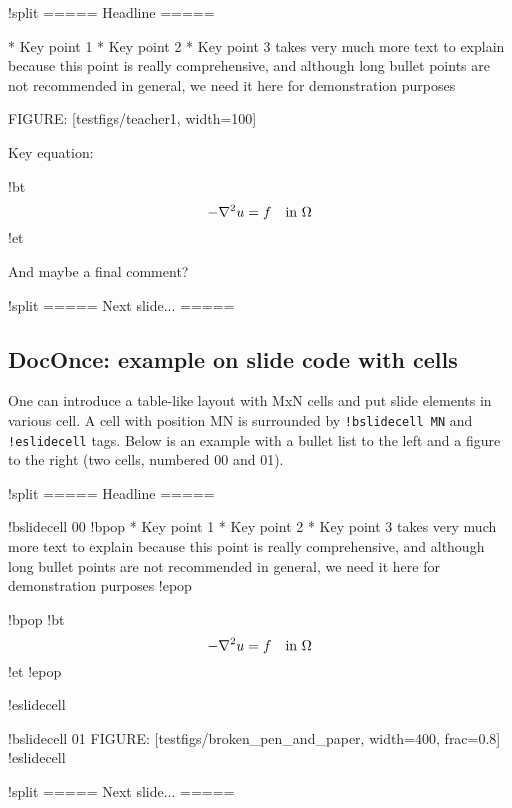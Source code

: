 \documentclass[%
oneside,                 %
final,                   %
10pt]{article}
\begin{document}
\bdat
!split
===== Headline =====

 * Key point 1
 * Key point 2
 * Key point 3 takes very much more text to explain because
   this point is really comprehensive, and although long
   bullet points are not recommended in general, we need
   it here for demonstration purposes

FIGURE: [testfigs/teacher1, width=100]

Key equation:

!bt
\[ -\nabla^2 u = f \quad\hbox{in }\Omega \]
!et

And maybe a final comment?

!split
===== Next slide... =====

\edat


\subsection{DocOnce: example on slide code with cells}

One can introduce a table-like layout with MxN cells and
put slide elements in various cell. A cell with position
MN is surrounded by \Verb?!bslidecell MN? and \Verb?!eslidecell?
tags. Below is an example with a bullet list to the left and
a figure to the right (two cells, numbered 00 and 01).





























\bdat
!split
===== Headline =====

!bslidecell 00
!bpop
 * Key point 1
 * Key point 2
 * Key point 3 takes very much more text to explain because
   this point is really comprehensive, and although long
   bullet points are not recommended in general, we need
   it here for demonstration purposes
!epop

!bpop
!bt
\[ -\nabla^2 u = f \quad\hbox{in }\Omega \]
!et
!epop

!eslidecell

!bslidecell 01
FIGURE: [testfigs/broken_pen_and_paper, width=400, frac=0.8]
!eslidecell

!split
===== Next slide... =====

\edat




\cleardoublepage{}  %
\printindex
\end{document}
